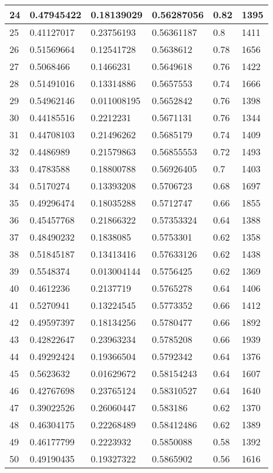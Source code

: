 \begin{longtable}{|l|l|l|l|l|l|}
24 & 0.47945422 & 0.18139029 & 0.56287056 & 0.82 & 1395 \\ \hline 
25 & 0.41127017 & 0.23756193 & 0.56361187 & 0.8 & 1411 \\ \hline 
26 & 0.51569664 & 0.12541728 & 0.5638612 & 0.78 & 1656 \\ \hline 
27 & 0.5068466 & 0.1466231 & 0.5649618 & 0.76 & 1422 \\ \hline 
28 & 0.51491016 & 0.13314886 & 0.5657553 & 0.74 & 1666 \\ \hline 
29 & 0.54962146 & 0.011008195 & 0.5652842 & 0.76 & 1398 \\ \hline 
30 & 0.44185516 & 0.2212231 & 0.5671131 & 0.76 & 1344 \\ \hline 
31 & 0.44708103 & 0.21496262 & 0.5685179 & 0.74 & 1409 \\ \hline 
32 & 0.4486989 & 0.21579863 & 0.56855553 & 0.72 & 1493 \\ \hline 
33 & 0.4783588 & 0.18800788 & 0.56926405 & 0.7 & 1403 \\ \hline 
34 & 0.5170274 & 0.13393208 & 0.5706723 & 0.68 & 1697 \\ \hline 
35 & 0.49296474 & 0.18035288 & 0.5712747 & 0.66 & 1855 \\ \hline 
36 & 0.45457768 & 0.21866322 & 0.57353324 & 0.64 & 1388 \\ \hline 
37 & 0.48490232 & 0.1838085 & 0.5753301 & 0.62 & 1358 \\ \hline 
38 & 0.51845187 & 0.13413416 & 0.57633126 & 0.62 & 1438 \\ \hline 
39 & 0.5548374 & 0.013004144 & 0.5756425 & 0.62 & 1369 \\ \hline 
40 & 0.4612236 & 0.2137719 & 0.5765278 & 0.64 & 1406 \\ \hline 
41 & 0.5270941 & 0.13224545 & 0.5773352 & 0.66 & 1412 \\ \hline 
42 & 0.49597397 & 0.18134256 & 0.5780477 & 0.66 & 1892 \\ \hline 
43 & 0.42822647 & 0.23963234 & 0.5785208 & 0.66 & 1939 \\ \hline 
44 & 0.49292424 & 0.19366504 & 0.5792342 & 0.64 & 1376 \\ \hline 
45 & 0.5623632 & 0.01629672 & 0.58154243 & 0.64 & 1607 \\ \hline 
46 & 0.42767698 & 0.23765124 & 0.58310527 & 0.64 & 1640 \\ \hline 
47 & 0.39022526 & 0.26060447 & 0.583186 & 0.62 & 1370 \\ \hline 
48 & 0.46304175 & 0.22268489 & 0.58412486 & 0.62 & 1389 \\ \hline 
49 & 0.46177799 & 0.2223932 & 0.5850088 & 0.58 & 1392 \\ \hline 
50 & 0.49190435 & 0.19327322 & 0.5865902 & 0.56 & 1616 \\ \hline 
\end{longtable}